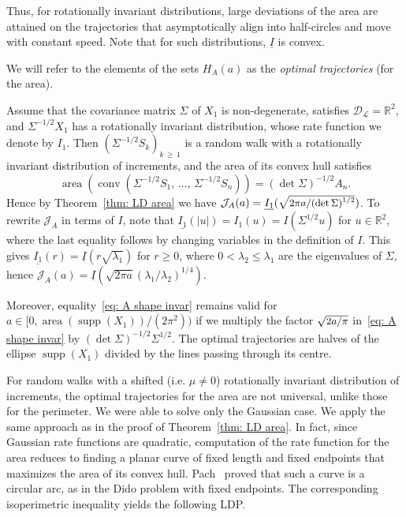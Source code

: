 \documentclass[AHL,Unicode,published]{cedram}
\DeclareMathOperator{\area}{area}
\DeclareMathOperator{\conv}{conv}
\newcommand{\ubar}[1]{\underline{#1}}
\newcommand{\Rbb}{\mathbb{R}}
\newcommand{\Dcl}{\mathcal{D}}
\newcommand{\Lcl}{\mathcal{L}}
\newcommand{\Jcl}{\mathcal{J}}
\newcommand{\supp}{\mathop{\mathrm{supp}}\nolimits}
\begin{document}
Thus, for rotationally invariant distributions, large deviations of the area are attained on the trajectories that asymptotically align into half-circles and move with constant speed. Note that for such distributions, $\ubar I$ is convex.

We will refer to the elements of the sets $H_A(a)$ as the \emph{optimal trajectories} (for the area).

\begin{rema}\label{Rem: elliptic}
Assume that the covariance matrix $\Sigma$ of $X_1$ is non-degenerate, satisfies $\Dcl_{\Lcl}=\Rbb^2$, and $\Sigma^{-1/2} X_1$ has a rotationally invariant distribution, whose rate function we denote by $I_1$. Then $(\Sigma^{-1/2} S_k)_{k\,\ge \,1}$ is a random walk with a rotationally invariant distribution of increments, and the area of its convex hull satisfies
\[
\area\left(\conv\left(\Sigma^{-1/2} S_1,\,\dots,\,\Sigma^{-1/2} S_n\right)\right) = (\det \Sigma)^{-1/2} A_n.
\]
Hence by Theorem~\ref{thm: LD area} we have $\Jcl_A(a)=\ubar {I_1} (\sqrt{\text{\small{$2 \pi a/ (\det \Sigma)^{1/2}$}}})$. To rewrite $\Jcl_A$ in terms of $I$, note that $\ubar {I_1} (|u|) = I_1(u) = I(\Sigma^{1/2} u)$ for $u \in \Rbb^2$, where the last equality follows by changing variables in the definition of $I$. This gives $\ubar {I_1} (r)= \ubar I (r \sqrt{\lambda_1})$ for $r \ge 0$, where $0< \lambda_2 \le \lambda_1$ are the eigenvalues of $\Sigma$, hence $\Jcl_A(a)=\ubar I (\sqrt{2 \pi a } (\lambda_1 / \lambda_2)^{1/4})$.

Moreover, equality~\eqref{eq: A shape invar} remains valid for $a\in [0, \area(\supp(X_1))/(2 \pi^2))$ if we multiply the factor $\sqrt{\text{\small{$2a/\pi$}}}$ in~\eqref{eq: A shape invar} by $(\det \Sigma)^{-1/2} \Sigma^{1/2}$. The optimal trajectories are halves of the ellipse $\supp(X_1)$ divided by the lines passing through its centre.
\end{rema}

For random walks with a shifted (i.e. $\mu \neq 0$) rotationally invariant distribution of increments, the optimal trajectories for the area are not universal, unlike those for the perimeter. We were able to solve only the Gaussian case. We apply the same approach as in the proof of Theorem~\ref{thm: LD area}. In fact, since Gaussian rate functions are quadratic, computation of the rate function for the area reduces to finding a planar curve of fixed length and fixed endpoints that maximizes the area of its convex hull. Pach~\cite{pach1978isoperimetric} proved that such a curve is a circular arc, as in the Dido problem with fixed endpoints. The corresponding isoperimetric inequality yields the following LDP.
\end{document}
